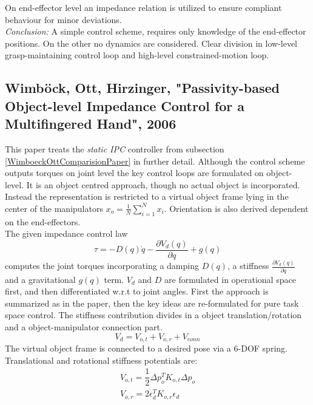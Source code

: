 \documentclass[conference]{IEEEtran}
\begin{document}
On end-effector level an impedance relation is utilized to ensure compliant behaviour for minor deviations.\\
\textit{Conclusion:} A simple control scheme, requires only knowledge of the end-effector positions. On the other no dynamics are considered. Clear division in low-level grasp-maintaining control loop and high-level constrained-motion loop.


\subsection{Wimb\"ock, Ott, Hirzinger, "Passivity-based Object-level Impedance Control for a Multifingered Hand", 2006}

This paper treats the \textit{static IPC} controller from subsection \ref{WimboeckOttComparisionPaper} in further detail. Although the control scheme outputs torques on joint level the key control loops are formulated on object-level. It is an object centred approach, though no actual object is incorporated. Instead the representation is restricted to a virtual object frame lying in the center of the manipulators $ x_o = \frac{1}{N}\sum\nolimits_{i=1}^N x_i $. Orientation is also derived dependent on the end-effectors.\\
The given impedance control law
\begin{equation}
\tau = -D(q)\dot{q} - \frac{\partial V_d(q)}{\partial q} + g(q)
\end{equation}
computes the joint torques incorporating a damping $ D(q) $, a stiffness $ \frac{\partial V_d(q)}{\partial q} $ and a gravitational $ g(q) $ term. $ V_d $ and $ D $ are formulated in operational space first, and then differentiated w.r.t to joint angles. First the approach is summarized as in the paper, then the key ideas are re-formulated for pure task space control.  
The stiffness contribution divides in a object translation/rotation and a object-manipulator connection part.
\begin{equation}
V_d = V_{o,t} + V_{o,r} + V_{conn}
\end{equation}
The virtual object frame is connected to a desired pose via a 6-DOF spring. Translational and rotational stiffness potentials are: 
\begin{subequations}
\begin{align}
V_{o,t} = \dfrac{1}{2}\Delta p_o^T K_{o,t} \Delta p_o \\
V_{o,r} = 2\epsilon_d^T K_{o,r} \epsilon_d 
\end{align}
\end{subequations}
\end{document}
